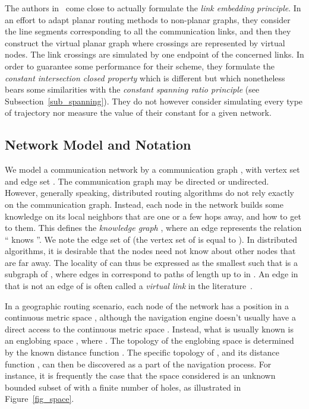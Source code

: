 \documentclass{article}
\begin{document}
The authors in~\cite{bib_embedding} come close to actually formulate the {\em link embedding principle}. In an effort to adapt planar routing methods to non-planar graphs, they consider the line segments corresponding to all the communication links, and then they construct the virtual planar graph where crossings are represented by virtual nodes. The link crossings are simulated by one endpoint of the concerned links. In order to guarantee some performance for their scheme, they formulate the {\em constant intersection closed property} which is different but which nonetheless bears some similarities with the {\em constant spanning ratio principle} (see Subsection~\ref{sub_spanning}). They do not however consider simulating every type of trajectory
 nor measure the value of their constant for a given network.
 
\subsection*{Network Model and Notation}
We model a communication network by a communication graph , with vertex set  and edge set . The communication graph may be directed or undirected. However, generally speaking, distributed routing algorithms do not rely exactly on the communication graph. Instead, each node in the network builds some knowledge on its local neighbors that are one or a few hops away, and how to get to them.  This defines the {\em knowledge graph} , where an edge  represents the relation `` knows ''. We note  the edge set of  (the vertex set of  is equal to ).
In distributed algorithms, it is desirable that the nodes need not know about other nodes that are far away.
The locality of  can thus be expressed as the smallest  such that  is a subgraph of , where edges in  correspond to paths of length up to  in . An edge in  that is not an edge of  is often called a {\em virtual link} in the literature~\cite{bib_book}.


In a geographic routing scenario, each node  of the network has a position  in a continuous metric space , although the navigation engine doesn't usually have a direct access to the continuous metric space . Instead, what is usually known is an englobing space , where . The topology of the englobing space  is determined by the known distance function .
The specific topology of , and its distance function , can then be discovered as a part of the navigation process. For instance, it is frequently the case that the space  considered is an unknown bounded subset of  with a finite number of holes, as illustrated in Figure~\ref{fig_space}.
\end{document}
